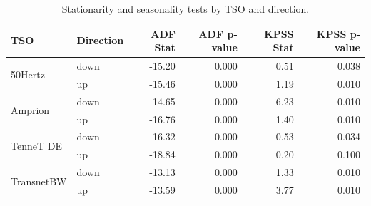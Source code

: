 \begin{table}
\caption{Stationarity and seasonality tests by TSO and direction.}
\label{tab:seasonality_tests}
\begin{tabular}{llrrrr}
\toprule
TSO & Direction & ADF Stat & ADF p-value & KPSS Stat & KPSS p-value \\
\midrule
\multirow[t]{2}{*}{50Hertz} & down & -15.20 & 0.000 & 0.51 & 0.038 \\
 & up & -15.46 & 0.000 & 1.19 & 0.010 \\
\cline{1-6}
\multirow[t]{2}{*}{Amprion} & down & -14.65 & 0.000 & 6.23 & 0.010 \\
 & up & -16.76 & 0.000 & 1.40 & 0.010 \\
\cline{1-6}
\multirow[t]{2}{*}{TenneT DE} & down & -16.32 & 0.000 & 0.53 & 0.034 \\
 & up & -18.84 & 0.000 & 0.20 & 0.100 \\
\cline{1-6}
\multirow[t]{2}{*}{TransnetBW} & down & -13.13 & 0.000 & 1.33 & 0.010 \\
 & up & -13.59 & 0.000 & 3.77 & 0.010 \\
\cline{1-6}
\bottomrule
\end{tabular}
\end{table}
